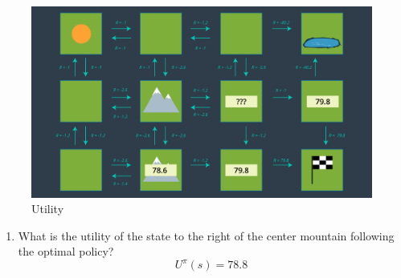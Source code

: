 \documentclass[10pt]{article}
\begin{document}
	\begin{figure}[h!]
		\includegraphics[width=\linewidth]{Images/mdp3.png}
		\caption{Utility}
	\end{figure}
	
\begin{enumerate}
	\item What is the utility of the state to the right of the center mountain following the optimal policy?
	$$U^\pi(s) = 78.8$$
	
\end{enumerate}
\end{document}
